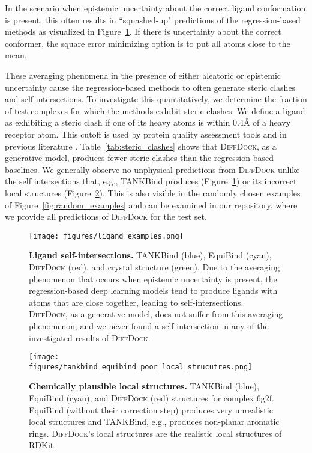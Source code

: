 \documentclass{article} \usepackage{iclr2023_conference,times}
\begin{document}
In the scenario when epistemic uncertainty about the correct ligand conformation is present, this often results in ``squashed-up" predictions of the regression-based methods as visualized in Figure~\ref{fig:self_intersections}. If there is uncertainty about the correct conformer, the square error minimizing option is to put all atoms close to the mean.



These averaging phenomena in the presence of either aleatoric or epistemic uncertainty cause the regression-based methods to often generate steric clashes and self intersections. To investigate this quantitatively, we determine the fraction of test complexes for which the methods exhibit steric clashes. We define a ligand as exhibiting a steric clash if one of its heavy atoms is within 0.4\AA{} of a heavy receptor atom. This cutoff is used by protein quality assessment tools and in previous literature \citep{Ramachandran2011stericClashes}. Table~\ref{tab:steric_clashes} shows that \textsc{DiffDock}, as a generative model, produces fewer steric clashes than the regression-based baselines. We generally observe no unphysical predictions from \textsc{DiffDock} unlike the self intersections that, e.g., TANKBind produces (Figure~\ref{fig:self_intersections}) or its incorrect local structures (Figure~\ref{fig:plausible_local_structures}). This is also visible in the randomly chosen examples of Figure~\ref{fig:random_examples} and can be examined in our repository, where we provide all predictions of \textsc{DiffDock} for the test set.

\begin{figure}[t]
    \centering
    \texttt{[image: figures/ligand\_examples.png]}
    \caption{\textbf{Ligand self-intersections.} TANKBind (blue), EquiBind (cyan), \textsc{DiffDock} (red), and crystal structure (green). Due to the averaging phenomenon that occurs when epistemic uncertainty is present, the regression-based deep learning models tend to produce ligands with atoms that are close together, leading to self-intersections. \textsc{DiffDock}, as a generative model, does not suffer from this averaging phenomenon, and we never found a self-intersection in any of the investigated results of \textsc{DiffDock}.}
    \label{fig:self_intersections}
\end{figure}

\begin{figure}[t]
    \centering
    \texttt{[image: figures/tankbind\_equibind\_poor\_local\_strucutres.png]}
    \caption{\textbf{Chemically plausible local structures.} TANKBind (blue), EquiBind (cyan), and \textsc{DiffDock} (red) structures for complex 6g2f. EquiBind (without their correction step) produces very unrealistic local structures and TANKBind, e.g., produces non-planar aromatic rings. \textsc{DiffDock}'s local structures are the realistic local structures of RDKit. }
    \label{fig:plausible_local_structures}
\end{figure}
\end{document}
